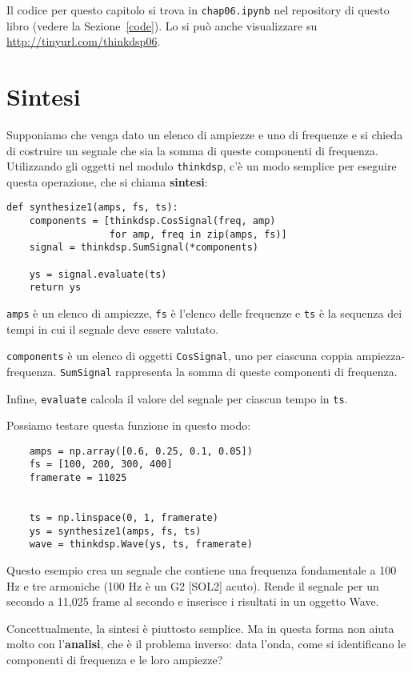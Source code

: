 \documentclass[12pt]{book} \usepackage[width=5.5in,height=8.5in, hmarginratio=3:2,vmarginratio=1:1]{geometry}
\begin{document}
Il codice per questo capitolo si trova in {\tt chap06.ipynb} nel repository di questo libro (vedere la Sezione~\ref{code}). Lo si può anche visualizzare su \url{http://tinyurl.com/thinkdsp06}.

\section{Sintesi} \label{synth1} 

Supponiamo che venga dato un elenco di ampiezze e uno di frequenze e si chieda di costruire un segnale che sia la somma di queste componenti di frequenza. Utilizzando gli oggetti nel modulo {\tt thinkdsp}, c'è un modo semplice per eseguire questa operazione, che si chiama {\bf sintesi}:

\begin{verbatim} 
def synthesize1(amps, fs, ts):
    components = [thinkdsp.CosSignal(freq, amp)
                  for amp, freq in zip(amps, fs)]
    signal = thinkdsp.SumSignal(*components)

    ys = signal.evaluate(ts)
    return ys
 \end{verbatim} 

{\tt amps} è un elenco di ampiezze, {\tt fs} è l'elenco delle frequenze e {\tt ts} è la sequenza dei tempi in cui il segnale deve essere valutato.

{\tt components} è un elenco di oggetti {\tt CosSignal}, uno per ciascuna coppia ampiezza-frequenza. {\tt SumSignal} rappresenta la somma di queste componenti di frequenza.

Infine, {\tt evaluate} calcola il valore del segnale per ciascun tempo in {\tt ts}.

Possiamo testare questa funzione in questo modo:

\begin{verbatim} 
    amps = np.array([0.6, 0.25, 0.1, 0.05])
    fs = [100, 200, 300, 400]
    framerate = 11025


    ts = np.linspace(0, 1, framerate)
    ys = synthesize1(amps, fs, ts)
    wave = thinkdsp.Wave(ys, ts, framerate)
 \end{verbatim} 

Questo esempio crea un segnale che contiene una frequenza fondamentale a 100 Hz e tre armoniche (100 Hz è un G2 [SOL2] acuto). Rende il segnale per un secondo a 11,025 frame al secondo e inserisce i risultati in un oggetto Wave.

Concettualmente, la sintesi è piuttosto semplice. Ma in questa forma non aiuta molto con l'{\bf analisi}, che è il problema inverso: data l'onda, come si identificano le componenti di frequenza e le loro ampiezze?
\end{document}
